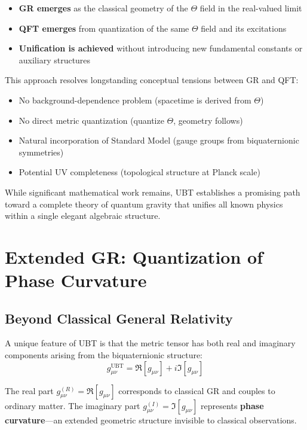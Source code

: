 \documentclass[12pt]{article}
\begin{document}
\begin{itemize}
    \item \textbf{GR emerges} as the classical geometry of the $\Theta$ field in the real-valued limit
    \item \textbf{QFT emerges} from quantization of the same $\Theta$ field and its excitations
    \item \textbf{Unification is achieved} without introducing new fundamental constants or auxiliary structures
\end{itemize}

This approach resolves longstanding conceptual tensions between GR and QFT:
\begin{itemize}
    \item No background-dependence problem (spacetime is derived from $\Theta$)
    \item No direct metric quantization (quantize $\Theta$, geometry follows)
    \item Natural incorporation of Standard Model (gauge groups from biquaternionic symmetries)
    \item Potential UV completeness (topological structure at Planck scale)
\end{itemize}

While significant mathematical work remains, UBT establishes a promising path toward a complete theory of quantum gravity that unifies all known physics within a single elegant algebraic structure.

\section{Extended GR: Quantization of Phase Curvature}

\subsection{Beyond Classical General Relativity}

A unique feature of UBT is that the metric tensor has both real and imaginary components arising from the biquaternionic structure:
\begin{equation}
    g_{\mu\nu}^{\text{UBT}} = \Re[g_{\mu\nu}] + i\Im[g_{\mu\nu}]
\end{equation}

The real part $g_{\mu\nu}^{(R)} = \Re[g_{\mu\nu}]$ corresponds to classical GR and couples to ordinary matter. The imaginary part $g_{\mu\nu}^{(I)} = \Im[g_{\mu\nu}]$ represents \textbf{phase curvature}—an extended geometric structure invisible to classical observations.
\end{document}

